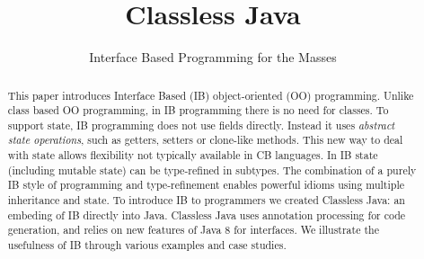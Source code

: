\documentclass[10pt,preprint,nocopyrightspace,numbers]{sigplanconf}
\begin{document}
\setlength{\pdfpageheight}{\paperheight}
\setlength{\pdfpagewidth}{\paperwidth}




\title{Classless Java}
\subtitle{Interface Based Programming for the Masses}

\authorinfo{}
           {}
           {}

\maketitle

\begin{abstract}

  This paper introduces Interface Based (IB) object-oriented (OO)
  programming. Unlike class based OO programming, in IB programming there
  is no need for classes. To support state, IB programming does not
  use fields directly. Instead it uses \emph{abstract state
    operations}, such as getters, setters or clone-like methods. This
  new way to deal with state allows flexibility not typically
  available in CB languages.  In IB state (including mutable state)
  can be type-refined in subtypes. The combination of a
  purely IB style of programming and type-refinement enables
  powerful idioms using multiple inheritance and state.  To introduce
  IB to programmers we created Classless Java: an embeding of IB
  directly into Java. Classless Java uses annotation processing for
  code generation, and relies on new features of Java 8 for
  interfaces. We illustrate the usefulness of IB through various
  examples and case studies.


\end{abstract}

\begin{comment}
\category{CR-number}{subcategory}{third-level}

\terms
term1, term2

\keywords
keyword1, keyword2
\end{comment}
\end{document}
